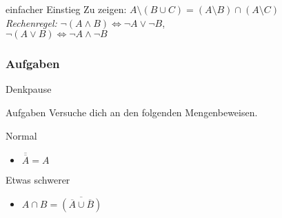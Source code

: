 \begin{frame}{einfacher Einstieg}
        \onslide
            Zu zeigen: $A \setminus (B \cup C) = (A \setminus B) \cap (A \setminus C)$
        \\
    \small{\emph{Rechenregel:} $\neg (A \wedge B) \iff \neg A \vee \neg B$, \\ \hspace{1.9cm}$\neg (A \vee B) \iff \neg A \wedge \neg B$}
\end{frame}



\subsubsection{Aufgaben}
{
\begin{frame}[fragile]{Denkpause}
    \begin{alertblock}{Aufgaben}
    Versuche dich an den folgenden Mengenbeweisen.
    \end{alertblock}
    
    \begin{block}{Normal}
        \begin{itemize}
            \item $\overline{\overline{A}} = A$
        \end{itemize}
    \end{block}
    \begin{block}{Etwas schwerer}
        \begin{itemize}
            \item $A\cap B=\overline{(\overline{A}\cup\overline{B})}$
        \end{itemize}
    \end{block}
\end{frame}
}

